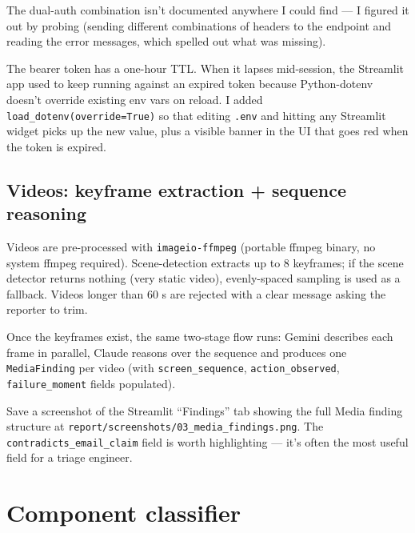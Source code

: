\documentclass[11pt,a4paper]{article}
\begin{document}
The dual-auth combination isn't documented anywhere I could find --- I
figured it out by probing (sending different combinations of headers to
the endpoint and reading the error messages, which spelled out what was
missing).

\begin{gotchabox}
The bearer token has a one-hour TTL. When it lapses mid-session, the
Streamlit app used to keep running against an expired token because
Python-dotenv doesn't override existing env vars on reload. I added
\texttt{load\_dotenv(override=True)} so that editing \texttt{.env} and
hitting any Streamlit widget picks up the new value, plus a visible
banner in the UI that goes red when the token is expired.
\end{gotchabox}

\subsection{Videos: keyframe extraction + sequence reasoning}

Videos are pre-processed with \texttt{imageio-ffmpeg} (portable ffmpeg
binary, no system ffmpeg required). Scene-detection extracts up to 8
keyframes; if the scene detector returns nothing (very static video),
evenly-spaced sampling is used as a fallback. Videos longer than 60 s are
rejected with a clear message asking the reporter to trim.

Once the keyframes exist, the same two-stage flow runs: Gemini describes
each frame in parallel, Claude reasons over the sequence and produces one
\texttt{MediaFinding} per video (with \texttt{screen\_sequence},
\texttt{action\_observed}, \texttt{failure\_moment} fields populated).

\begin{screenshotbox}
Save a screenshot of the Streamlit ``Findings'' tab showing the full
Media finding structure at
\texttt{report/screenshots/03\_media\_findings.png}. The
\texttt{contradicts\_email\_claim} field is worth highlighting --- it's
often the most useful field for a triage engineer.
\end{screenshotbox}

\newpage

\section{Component classifier}\label{sec:classifier}
\end{document}
